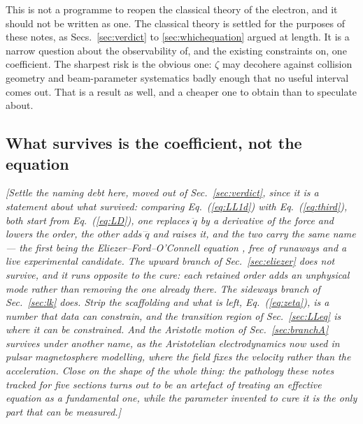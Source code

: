 \documentclass[preprint]{aastex701}
\newcommand{\note}[1]{{\color{blue}\textit{[#1]}}}
\begin{document}
This is not a programme to reopen the classical theory of the electron, and it
should not be written as one. The classical theory is settled for the purposes
of these notes, as Secs.~\ref{sec:verdict} to \ref{sec:whichequation} argued at
length. It is a narrow question about the observability of, and the existing
constraints on, one coefficient. The sharpest risk is the obvious one: $\zeta$
may decohere against collision geometry and beam-parameter systematics badly
enough that no useful interval comes out. That is a result as well, and a
cheaper one to obtain than to speculate about.

\subsection{What survives is the coefficient, not the equation}
\label{sec:survives}
\note{Settle the naming debt here, moved out of Sec.~\ref{sec:verdict}, since it
is a statement about what survived: comparing Eq.~(\ref{eq:LL1d}) with
Eq.~(\ref{eq:third}), both start from Eq.~(\ref{eq:LD}), one replaces $\ddot q$
by a derivative of the force and lowers the order, the other adds $\dddot q$ and
raises it, and the two carry the same name --- the first being the
Eliezer--Ford--O'Connell equation \citep{eliezer1948,ford_oconnell1991}, free of
runaways and a live experimental candidate.
The upward branch of Sec.~\ref{sec:eliezer} does not survive, and it runs
opposite to the cure: each retained order adds an unphysical mode rather than
removing the one already there. The sideways branch of Sec.~\ref{sec:lk} does.
Strip the scaffolding and what is left, Eq.~(\ref{eq:zeta}), is a number that
data can constrain, and the transition region of Sec.~\ref{sec:LLeq} is where
it can be constrained. And the Aristotle motion of Sec.~\ref{sec:branchA}
survives under another name, as the Aristotelian electrodynamics now used in
pulsar magnetosphere modelling, where the field fixes the velocity rather than
the acceleration. Close on the shape of the whole thing: the pathology these
notes tracked for five sections turns out to be an artefact of treating an
effective equation as a fundamental one, while the parameter invented to cure
it is the only part that can be measured.}
\end{document}
